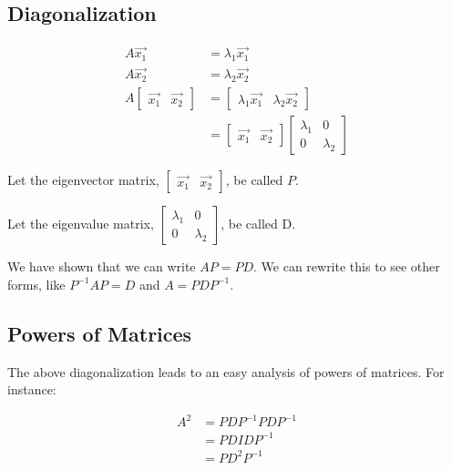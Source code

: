\documentclass[10pt,landscape,a4paper]{article}
\begin{document}
\begin{multicols*}{3}
  \section{Diagonalization}
  \begin{align*}
    A \vec{x_1} &= \lambda_1 \vec{x_1} \\
    A \vec{x_2} &= \lambda_2 \vec{x_2} \\
    A \begin{bmatrix} \vec{x_1} & \vec{x_2} \end{bmatrix} &= \begin{bmatrix}
  \lambda_1 \vec{x_1} & \lambda_2 \vec{x_2} \end{bmatrix}\\
                        &= \begin{bmatrix} \vec{x_1} & \vec{x_2} \end{bmatrix}
                        \begin{bmatrix} \lambda_1 & 0 \\ 0 & \lambda_2 \end{bmatrix}
  \end{align*}

                        Let the eigenvector matrix, $\begin{bmatrix} \vec{x_1} &
                        \vec{x_2} \end{bmatrix}$, be called $P$.

                        Let the eigenvalue matrix, $\begin{bmatrix} \lambda_1 &
                        0 \\ 0 & \lambda_2 \end{bmatrix}$, be called D.

                        We have shown that we can write $AP = PD$. We can
                        rewrite this to see other forms, like $P^{-1} A P = D$
                        and $A = PDP^{-1}$.
  \subsection{Powers of Matrices}
  The above diagonalization leads to an easy analysis of powers of matrices. For
  instance:

  \begin{align*}
    A^2 &= PDP^{-1}PDP^{-1} \\
        &= PDIDP^{-1} \\
        &= PD^2P^{-1}
  \end{align*}


\end{multicols*}
\end{document}
